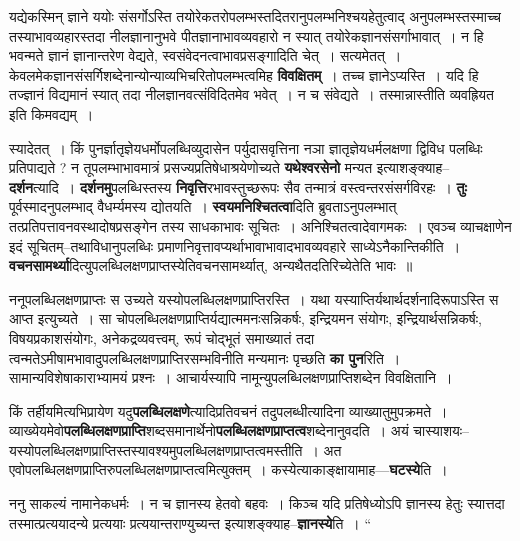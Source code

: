 \documentclass[article,12pt,a4paper]{memoir}
\begin{document}
	  \endgroup
	

	  \pstart यद्येकस्मिन् ज्ञाने ययोः संसर्गोऽस्ति तयोरेकतरोपलम्भस्तदितरानुपलम्भनिश्चयहेतुत्वाद् अनुपलम्भस्तस्माच्च तस्याभावव्यहारस्तदा नीलज्ञानानुभवे पीतज्ञानाभावव्यवहारो न स्यात् तयोरेकज्ञा\leavevmode{}नसंसर्गाभावात् । न हि भवन्मते ज्ञानं ज्ञानान्तरेण वेद्यते, स्वसंवेदनत्वाभावप्रसङ्गादिति चेत् । सत्यमेतत् । केवलमेकज्ञानसंसर्गिशब्देनान्योन्याव्यभिचरितोपलम्भत्वमिह \textbf{विवक्षितम्} । तच्च ज्ञानेऽप्यस्ति । यदि हि तज्ज्ञानं विद्यमानं स्यात् तदा नीलज्ञानवत्संविदितमेव भवेत् । न च संवेद्यते । तस्मान्नास्तीति व्यवह्रियत इति किमवद्यम् ।
	\pend
      

	  \pstart स्यादेतत् । किं पुनर्ज्ञातृज्ञेयधर्मोपलब्धिव्युदासेन पर्युदासवृत्तिना नञा ज्ञातृज्ञेयधर्मलक्षणा द्विविध पलब्धिः प्रतिपाद्यते ? न तूपलम्भाभावमात्रं प्रसज्यप्रतिषेधाश्रयेणोच्यते \textbf{यथेश्वरसेनो} मन्यत इत्याशङ्क्याह--\textbf{दर्शन}त्यादि । \textbf{दर्शनमु}पलब्धिस्तस्य \textbf{निवृत्ति}रभावस्तुच्छरूपः सैव तन्मात्रं वस्त्वन्तरसंसर्गविरहः । \textbf{तुः} पूर्वस्मादनुपलम्भाद् वैधर्म्यमस्य द्योतयति । \textbf{स्वयमनिश्चितत्वा}दिति ब्रुवताऽनुपलम्भात् तत्प्रतिपत्तावनवस्थादोषप्रसङ्गेन तस्य साधकाभावः सूचितः । अनिश्चितत्वादेवागमकः । एवञ्च व्याचक्षाणेन इदं सूचितम्--तथाविधानुपलब्धिः प्रमाणनिवृत्तावप्यर्थाभावाभावादभावव्यवहारे साध्येऽनैकान्तिकीति । \textbf{वचनसामर्थ्या}दित्युपलब्धिलक्षणप्राप्तस्येतिवचनसामर्थ्यात्, अन्यथैतदतिरिच्येतेति भावः ॥
	\pend
      

	  \pstart ननूपलब्धिलक्षणप्राप्तः स उच्यते यस्योपलब्धिलक्षणप्राप्तिरस्ति । यथा यस्याप्तिर्यथार्थदर्शनादिरूपाऽस्ति स आप्त इत्युच्यते । सा चोपलब्धिलक्षणप्राप्तिर्यद्यात्ममनःसन्निकर्षः, इन्द्रियमन संयोगः, इन्द्रियार्थसन्निकर्षः, विषयप्रकाशसंयोगः, अनेकद्रव्यवत्त्वम्, रूपं चोद्भूतं समाख्यातं तदा त्वन्मतेऽमीषामभावादुपलब्धिलक्षणप्राप्तिरसम्भविनीति मन्यमानः पृच्छति \textbf{का पुन}रिति । सामान्यविशेषाकाराभ्यामयं प्रश्नः । आचार्यस्यापि नामून्युपलब्धिलक्षणप्राप्तिशब्देन विवक्षितानि ।
	\pend
      

	  \pstart किं तर्हीयमित्यभिप्रायेण यदु\textbf{पलब्धिलक्षणे}त्यादिप्रतिवचनं तदुपलब्धीत्यादिना व्याख्यातुमुपक्रमते । व्याख्येयमेवो\textbf{पलब्धिलक्षणप्राप्ति}शब्दसमानार्थेनो\textbf{पलब्धिलक्षणप्राप्तत्व}शब्देनानुवदति । अयं चास्याशयः--यस्योपलब्धिलक्षणप्राप्तिस्तस्यावश्यमुपलब्धिलक्षणप्राप्तत्वमस्तीति । अत एवोपलब्धिलक्षणप्राप्तिरुपलब्धिलक्षणप्राप्तत्वमित्युक्तम् । कस्येत्याकाङ्क्षायामाह—\textbf{घटस्ये}ति ।
	\pend
      

	  \pstart ननु साकल्यं नामानेकधर्मः । न च ज्ञानस्य हेतवो बहवः । किञ्च यदि प्रतिषेध्योऽपि ज्ञानस्य हेतुः स्यात्तदा तस्मात्प्रत्ययादन्ये प्रत्ययाः प्रत्ययान्तराण्युच्यन्त इत्याशङ्क्याह--\textbf{ज्ञानस्ये}ति । \leavevmode{} “
	  
\end{document}
